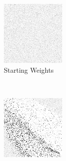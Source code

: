 
\begin{figure}
\center

	\begin{subfigure}[t]{0.2\textwidth}
	\includegraphics[width=\textwidth]{images/findings/round1/flipbook_a.png}
	\caption{Starting Weights}
	\end{subfigure}
	~
	\begin{subfigure}[t]{0.2\textwidth}
	\includegraphics[width=\textwidth]{images/findings/round1/flipbook_b.png}

\end{subfigure}
\end{figure}
